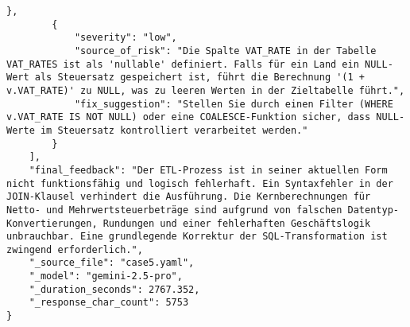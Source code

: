 \begin{lstlisting}[caption={Ausgabe: GEMINI 2.5 Pro Anwendungsfall 5 Robustheitsdurchlauf},label={gemini_case5_prompt3}]
        },
        {
            "severity": "low",
            "source_of_risk": "Die Spalte VAT_RATE in der Tabelle VAT_RATES ist als 'nullable' definiert. Falls für ein Land ein NULL-Wert als Steuersatz gespeichert ist, führt die Berechnung '(1 + v.VAT_RATE)' zu NULL, was zu leeren Werten in der Zieltabelle führt.",
            "fix_suggestion": "Stellen Sie durch einen Filter (WHERE v.VAT_RATE IS NOT NULL) oder eine COALESCE-Funktion sicher, dass NULL-Werte im Steuersatz kontrolliert verarbeitet werden."
        }
    ],
    "final_feedback": "Der ETL-Prozess ist in seiner aktuellen Form nicht funktionsfähig und logisch fehlerhaft. Ein Syntaxfehler in der JOIN-Klausel verhindert die Ausführung. Die Kernberechnungen für Netto- und Mehrwertsteuerbeträge sind aufgrund von falschen Datentyp-Konvertierungen, Rundungen und einer fehlerhaften Geschäftslogik unbrauchbar. Eine grundlegende Korrektur der SQL-Transformation ist zwingend erforderlich.",
    "_source_file": "case5.yaml",
    "_model": "gemini-2.5-pro",
    "_duration_seconds": 2767.352,
    "_response_char_count": 5753
}
\end{lstlisting}


